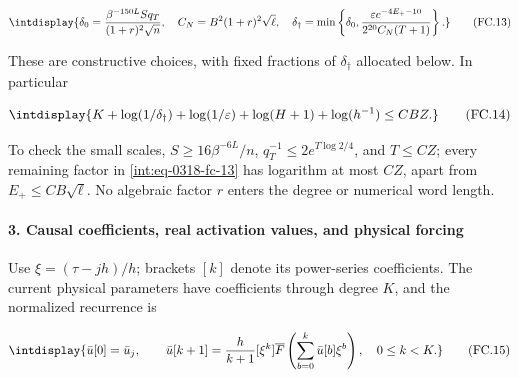 \begingroup\renewcommand{\theHequation}{intdisplay.709}
\begin{equation}
\intdisplay{
\delta_0=\frac{\beta^{-150L}S q_T}{(1+r)^2\sqrt n},\quad
C_N=B^2(1+r)^2\sqrt\ell,\quad
\delta_\dagger=\min\left\{\delta_0,
\frac{\varepsilon e^{-4E_+-10}}{2^{20}C_N(T+1)}\right\}.
}
\tag{FC.13}
\label{int:eq-0318-fc-13}
\end{equation}
\endgroup


These are constructive choices, with fixed fractions of \(\delta_\dagger\) allocated below. In particular


\begingroup\renewcommand{\theHequation}{intdisplay.710}
\begin{equation}
\intdisplay{
K+\log(1/\delta_\dagger)+\log(1/\varepsilon)
+\log(H+1)+\log(h^{-1})\le CBZ.
}
\tag{FC.14}
\label{int:eq-0319-fc-14}
\end{equation}
\endgroup


To check the small scales, \(S\ge16\beta^{-6L}/n\), \(q_T^{-1}\le2e^{T\log2/4}\), and \(T\le CZ\); every remaining factor in \eqref{int:eq-0318-fc-13} has logarithm at most \(CZ\), apart from \(E_+\le CB\sqrt\ell\). No algebraic factor \(r\) enters the degree or numerical word length.


\paragraph{3. Causal coefficients, real activation values, and physical forcing}
\label{int:decoder-physical-forcing}

\mbox{}\par\smallskip


Use \(\xi=(\tau-jh)/h\); brackets \([k]\) denote its power-series coefficients. The current physical parameters have coefficients through degree \(K\), and the normalized recurrence is


\begingroup\renewcommand{\theHequation}{intdisplay.711}
\begin{equation}
\intdisplay{
\bar u[0]=\bar u_j,\qquad
\bar u[k+1]=\frac h{k+1}[\xi^k]\overline F
\left(\sum_{b=0}^k\bar u[b]\xi^b\right),\quad 0\le k<K.
}
\tag{FC.15}
\label{int:eq-0320-fc-15}
\end{equation}
\endgroup


